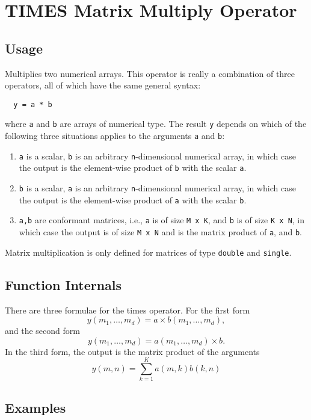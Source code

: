 \section{TIMES Matrix Multiply Operator}

\subsection{Usage}

Multiplies two numerical arrays.  This operator is really a combination
of three operators, all of which have the same general syntax:
\begin{verbatim}
  y = a * b
\end{verbatim}
where \verb|a| and \verb|b| are arrays of numerical type.  The result \verb|y| depends
on which of the following three situations applies to the arguments
\verb|a| and \verb|b|:
\begin{enumerate}
  \item \verb|a| is a scalar, \verb|b| is an arbitrary \verb|n|-dimensional numerical array, in which case the output is the element-wise product of \verb|b| with the scalar \verb|a|.
  \item \verb|b| is a scalar, \verb|a| is an arbitrary \verb|n|-dimensional numerical array, in which case the output is the element-wise product of \verb|a| with the scalar \verb|b|.
  \item \verb|a,b| are conformant matrices, i.e., \verb|a| is of size \verb|M x K|, and \verb|b| is of size \verb|K x N|, in which case the output is of size \verb|M x N| and is the matrix product of \verb|a|, and \verb|b|.
\end{enumerate}
Matrix multiplication is only defined for matrices of type \verb|double| 
and \verb|single|.
\subsection{Function Internals}

There are three formulae for the times operator.  For the first form
\[
y(m_1,\ldots,m_d) = a \times b(m_1,\ldots,m_d),
\]
and the second form
\[
y(m_1,\ldots,m_d) = a(m_1,\ldots,m_d) \times b.
\]
In the third form, the output is the matrix product of the arguments
\[
y(m,n) = \sum_{k=1}^{K} a(m,k) b(k,n)
\]
\subsection{Examples}

